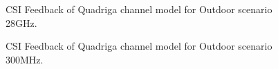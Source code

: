 \documentclass[lettersize,journal]{IEEEtran}
\begin{document}
    

	
\begin{figure}[ht]
		\centering
		\hfill
		\hfill
		\caption{CSI Feedback of Quadriga channel model for Outdoor scenario 28GHz.}
		\label{fig:quadriga_28ghz}
	\end{figure}
	
	\begin{figure}[ht]
		\centering
		\hfill
		\hfill
		\caption{CSI Feedback of Quadriga channel model for Outdoor scenario 300MHz.}
		\label{fig:quadriga_300mhz}
	\end{figure}
	
\end{document}
